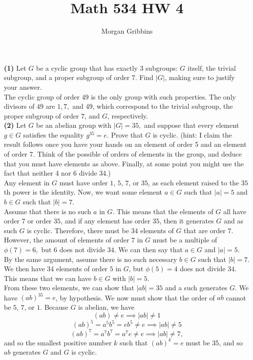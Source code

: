 \documentclass[12pt,letterpaper]{article}
\title{Math 534 HW 4}
\author{Morgan Gribbins}
\date{}
\begin{document}
	
\maketitle

\textbf{(1)} Let \(G\) be a cyclic group that has exactly 3 subgroups: \(G\) itself, the trivial subgroup, and a proper subgroup of order \(7\). Find \(|G|\), making sure to justify your answer. \\

The cyclic group of order \(49\) is the only group with such properties. The only divisors of \(49\) are \(1,7,\) and \(49\), which correspond to the trivial subgroup, the proper subgroup of order \(7\), and \(G\), respectively. \\

\textbf{(2)} Let \(G\) be an abelian group with \(|G|= 35,\) and suppose that every element \(g \in G \) satisfies the equality \(g^{35}=e\).  Prove that \(G\) is cyclic.  (hint: I claim the result follows once you have your hands on an element of order 5 and an element of order 7.  Think of the possible of orders of elements in the group, and deduce that you must have elements as above.  Finally, at some point you might use the fact that neither 4 nor 6 divide 34.) \\

Any element in \(G\) must have order \(1\), \(5\), \(7\), or \(35\), as each element raised to the \(35\)th power is the identity. Now, we want some element \(a \in G\) such that \(|a| = 5\) and \(b \in G\) such that \(|b| = 7\). \\

Assume that there is no such \(a\) in \(G\). This means that the elements of \(G\) all have order \(7\) or order \(35\), and if any element has order \(35\), then it generates \(G\) and as such \(G\) is cyclic. Therefore, there must be \(34\) elements of \(G\) that are order \(7\). However, the amount of elements of order \(7\) in \(G\) must be a multiple of \(\phi(7)= 6,\) but \(6\) does not divide \(34\). We can then say that \(a \in G\) and \(|a| = 5\). \\

By the same argument, assume there is no such necessary \(b\in G\) such that \(|b| = 7\). We then have \(34\) elements of order \(5\) in \(G\), but \(\phi(5) = 4\) does not divide \(34\). This means that we can have \(b \in G\) with \(|b|= 5\). \\

From these two elements, we can show that \(|ab| = 35\) and a such generates \(G\). We have \((ab)^{35} = e\), by hypothesis. We now must show that the order of \(ab\) cannot be \(5\), \(7\), or \(1\). Because \(G\) is abelian, we have \[(ab) \neq e \implies |ab| \neq 1\]\[(ab)^{5} = a^{5}b^{5} = eb^{5} \neq e \implies |ab| \neq 5\]\[(ab)^{7} = a^{7}b^{7} = a^{7}e \neq e \implies |ab| \neq 7,\] and so the smallest positive number \(k\) such that \((ab)^{k} = e\) must be 35, and so \(ab\) generates \(G\) and \(G\) is cyclic. \\
\end{document}
